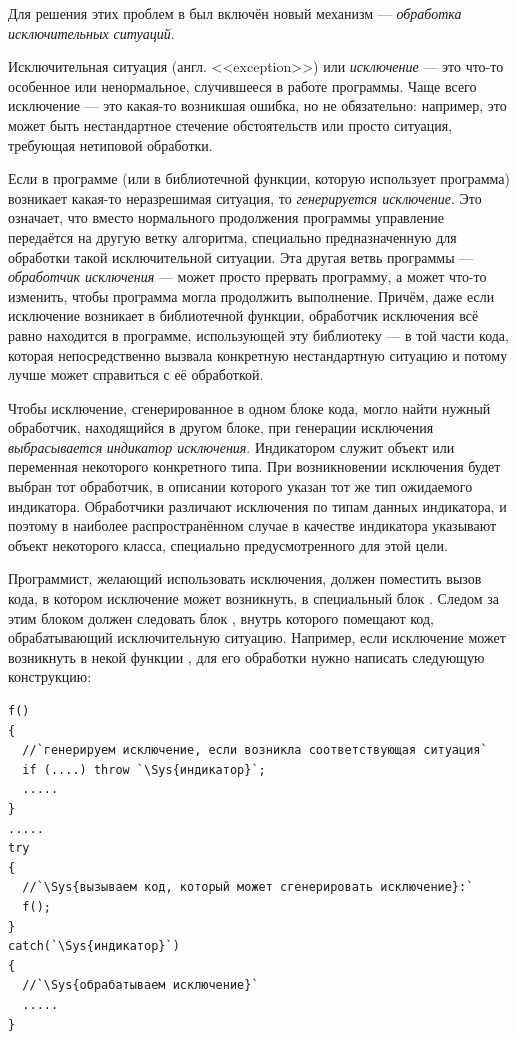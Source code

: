 Для решения этих проблем в  был включён новый механизм --- \emph{обработка исключительных ситуаций}.

Исключительная ситуация (англ. <<exception>>) или \emph{исключение} --- это что-то особенное
или ненормальное, случившееся в работе программы. Чаще всего исключение --- это какая-то возникшая ошибка, но не
обязательно: например, это может быть нестандартное стечение обстоятельств или просто ситуация, требующая нетиповой
обработки.

Если в программе (или в библиотечной функции, которую использует программа) возникает какая-то неразрешимая ситуация, то
\emph{генерируется исключение}. Это означает, что вместо нормального продолжения программы
управление передаётся на другую ветку алгоритма, специально предназначенную для обработки такой исключительной
ситуации. Эта другая ветвь программы --- \emph{обработчик исключения}
--- может просто прервать программу, а может что-то изменить, чтобы программа могла продолжить выполнение. Причём, даже
если исключение возникает в библиотечной функции,  обработчик исключения всё равно находится в программе, использующей
эту библиотеку --- в той части кода,  которая непосредственно вызвала конкретную нестандартную ситуацию и потому лучше
может справиться с её обработкой.

Чтобы исключение, сгенерированное в одном блоке кода, могло найти нужный обработчик, находящийся в другом блоке, при
генерации исключения \emph{выбрасывается}
 \emph{индикатор исключения}. Индикатором служит объект или переменная
некоторого конкретного типа. При возникновении исключения будет выбран тот обработчик, в описании которого указан тот
же тип ожидаемого индикатора. Обработчики различают исключения по типам данных индикатора, и поэтому в наиболее
распространённом случае в качестве индикатора указывают объект некоторого класса, специально предусмотренного для этой
цели.

Программист, желающий использовать исключения, должен поместить вызов кода, в котором исключение может возникнуть, в
специальный блок . Следом за этим блоком должен следовать блок
, внутрь которого помещают код, обрабатывающий исключительную ситуацию. Например, если
исключение может возникнуть в некой функции , для его обработки нужно написать следующую
конструкцию:
\begin{lstlisting}
f() 
{
  //`генерируем исключение, если возникла соответствующая ситуация`
  if (....) throw `\Sys{индикатор}`;
  .....
}	
.....
try 
{
  //`\Sys{вызываем код, который может сгенерировать исключение}:`
  f();
}
catch(`\Sys{индикатор}`) 
{
  //`\Sys{обрабатываем исключение}`
  .....
}
\end{lstlisting}


